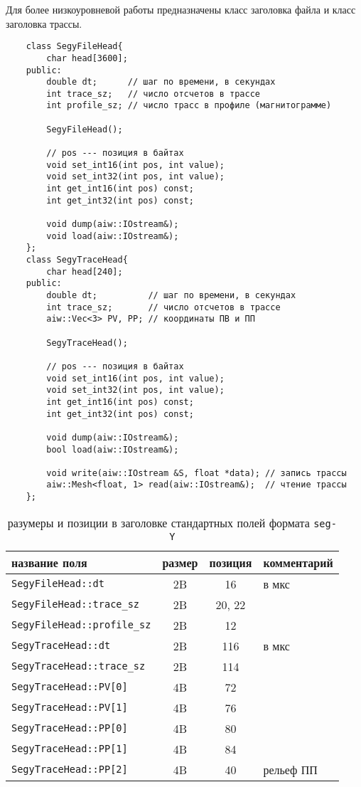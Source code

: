 Для более низкоуровневой работы предназначены класс заголовка файла и класс заголовка трассы.
\begin{verbatim}
    class SegyFileHead{
		char head[3600];
    public:
        double dt;      // шаг по времени, в секундах
        int trace_sz;   // число отсчетов в трассе
        int profile_sz; // число трасс в профиле (магнитограмме)

        SegyFileHead();

		// pos --- позиция в байтах
        void set_int16(int pos, int value);
        void set_int32(int pos, int value);
        int get_int16(int pos) const;
        int get_int32(int pos) const;

        void dump(aiw::IOstream&);
        void load(aiw::IOstream&);
    };
    class SegyTraceHead{
        char head[240];
    public:
        double dt;          // шаг по времени, в секундах
        int trace_sz;       // число отсчетов в трассе
        aiw::Vec<3> PV, PP; // координаты ПВ и ПП

        SegyTraceHead();

        // pos --- позиция в байтах
        void set_int16(int pos, int value);
        void set_int32(int pos, int value);
        int get_int16(int pos) const;
        int get_int32(int pos) const;

        void dump(aiw::IOstream&);
        bool load(aiw::IOstream&);

        void write(aiw::IOstream &S, float *data); // запись трассы
        aiw::Mesh<float, 1> read(aiw::IOstream&);  // чтение трассы
    };
\end{verbatim}
\begin{table}
  \begin{center}
  \begin{tabular}{|l|c|c|l|}
    \hline
    название поля                   & размер & позиция & комментарий \\
    \hline
    \verb'SegyFileHead::dt'         & 2B     & 16      & в мкс       \\
    \verb'SegyFileHead::trace_sz'   & 2B     & 20, 22  &             \\ 
    \verb'SegyFileHead::profile_sz' & 2B     & 12      &             \\ 
    \verb'SegyTraceHead::dt'        & 2B     & 116     & в мкс       \\
    \verb'SegyTraceHead::trace_sz'  & 2B     & 114     &             \\
    \verb'SegyTraceHead::PV[0]'     & 4B     & 72      &             \\
    \verb'SegyTraceHead::PV[1]'     & 4B     & 76      &             \\
    \verb'SegyTraceHead::PP[0]'     & 4B     & 80      &             \\
    \verb'SegyTraceHead::PP[1]'     & 4B     & 84      &             \\
    \verb'SegyTraceHead::PP[2]'     & 4B     & 40      & рельеф ПП   \\
    \hline
  \end{tabular}
  \end{center}
\caption{разумеры и позиции в заголовке стандартных полей формата {\tt seg-Y}}\label{segy:fields:table}
\end{table}
